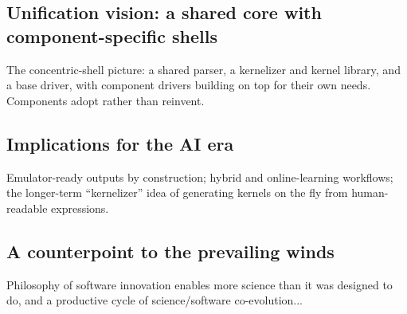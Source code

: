 \documentclass[gmd, manuscript]{copernicus}
\begin{document}
\subsection{Unification vision: a shared core with component-specific shells}
The concentric-shell picture: a shared parser, a kernelizer and kernel library, and a base driver, with component drivers building on top for their own needs.
Components adopt rather than reinvent.

\subsection{Implications for the AI era}
Emulator-ready outputs by construction; hybrid and online-learning workflows; the longer-term
``kernelizer'' idea of generating kernels on the fly from human-readable expressions.

\subsection{A counterpoint to the prevailing winds}


\conclusions  %
Philosophy of software innovation enables more science than it was designed to do, and a productive cycle of science/software co-evolution...







\appendix
\section{}    %

\subsection{}     %


\noappendix       %

\end{document}
